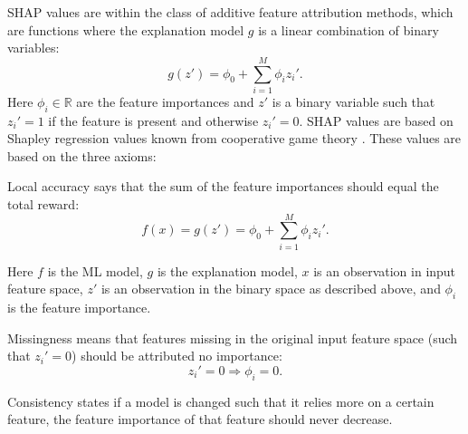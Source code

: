 SHAP values are within the class of additive feature attribution methods, which are functions where the explanation model $g$ is a linear combination of binary variables:
\begin{equation}
  \label{eq:ml:additive_feature_attribution_method}
  g(z') = \phi_0 + \sum_{i=1}^M \phi_i z_i'.
\end{equation}
Here $\phi_i \in \mathbb{R}$ are the feature importances and $z'$ is a binary variable such that $z_i'=1$ if the feature is present and otherwise $z_i' = 0$. SHAP values are based on Shapley regression values known from cooperative game theory \autocite{Shapley1953}. These values are based on the three axioms:
\begin{axiom}
  Local accuracy says that the sum of the feature importances should equal the total reward:
  \begin{equation}
    f(x) = g(z') = \phi_0 + \sum_{i=1}^M \phi_i z_i'.
  \end{equation}
\end{axiom}
Here $f$ is the ML model, $g$ is the explanation model, $x$ is an observation in input feature space, $z'$ is an observation in the binary space as described above, and $\phi_i$ is the feature importance. 
\begin{axiom}[Missingness]
  Missingness means that features missing in the original input feature space (such that $z_i'=0$) should be attributed no importance:
  \begin{equation}
    z_i' = 0 \Rightarrow \phi_i = 0.
  \end{equation} 
\end{axiom}
\begin{axiom}[Consistency]
  \label{axiom:ml:shap_consistency}
  Consistency states if a model is changed such that it relies more on a certain feature, the feature importance of that feature should never decrease. 
\end{axiom}

